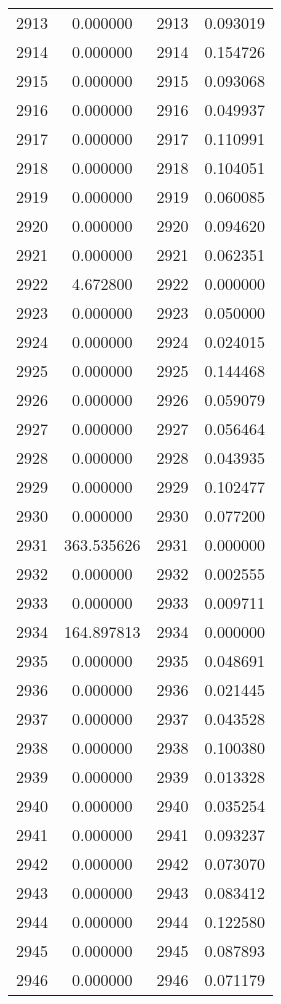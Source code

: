 \documentclass[12pt]{article}
\begin{document}
\begin{longtable}{@{}cccc@{}}
2913 & 0.000000 & 2913 & 0.093019 \\
2914 & 0.000000 & 2914 & 0.154726 \\
2915 & 0.000000 & 2915 & 0.093068 \\
2916 & 0.000000 & 2916 & 0.049937 \\
2917 & 0.000000 & 2917 & 0.110991 \\
2918 & 0.000000 & 2918 & 0.104051 \\
2919 & 0.000000 & 2919 & 0.060085 \\
2920 & 0.000000 & 2920 & 0.094620 \\
2921 & 0.000000 & 2921 & 0.062351 \\
2922 & 4.672800 & 2922 & 0.000000 \\
2923 & 0.000000 & 2923 & 0.050000 \\
2924 & 0.000000 & 2924 & 0.024015 \\
2925 & 0.000000 & 2925 & 0.144468 \\
2926 & 0.000000 & 2926 & 0.059079 \\
2927 & 0.000000 & 2927 & 0.056464 \\
2928 & 0.000000 & 2928 & 0.043935 \\
2929 & 0.000000 & 2929 & 0.102477 \\
2930 & 0.000000 & 2930 & 0.077200 \\
2931 & 363.535626 & 2931 & 0.000000 \\
2932 & 0.000000 & 2932 & 0.002555 \\
2933 & 0.000000 & 2933 & 0.009711 \\
2934 & 164.897813 & 2934 & 0.000000 \\
2935 & 0.000000 & 2935 & 0.048691 \\
2936 & 0.000000 & 2936 & 0.021445 \\
2937 & 0.000000 & 2937 & 0.043528 \\
2938 & 0.000000 & 2938 & 0.100380 \\
2939 & 0.000000 & 2939 & 0.013328 \\
2940 & 0.000000 & 2940 & 0.035254 \\
2941 & 0.000000 & 2941 & 0.093237 \\
2942 & 0.000000 & 2942 & 0.073070 \\
2943 & 0.000000 & 2943 & 0.083412 \\
2944 & 0.000000 & 2944 & 0.122580 \\
2945 & 0.000000 & 2945 & 0.087893 \\
2946 & 0.000000 & 2946 & 0.071179 \\

\end{longtable}
\end{document}
